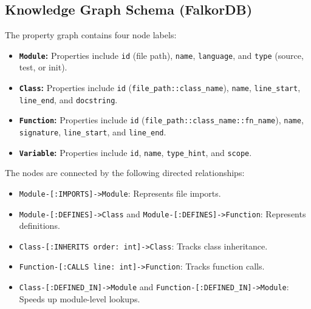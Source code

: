 \documentclass[12pt,a4paper,oneside]{report}
\begin{document}
\subsection{Knowledge Graph Schema (FalkorDB)}
The property graph contains four node labels:
\begin{itemize}
    \item \textbf{\texttt{Module}:} Properties include \texttt{id} (file path), \texttt{name}, \texttt{language}, and \texttt{type} (source, test, or init).
    \item \textbf{\texttt{Class}:} Properties include \texttt{id} (\texttt{file\_path::class\_name}), \texttt{name}, \texttt{line\_start}, \texttt{line\_end}, and \texttt{docstring}.
    \item \textbf{\texttt{Function}:} Properties include \texttt{id} (\texttt{file\_path::class\_name::fn\_name}), \texttt{name}, \texttt{signature}, \texttt{line\_start}, and \texttt{line\_end}.
    \item \textbf{\texttt{Variable}:} Properties include \texttt{id}, \texttt{name}, \texttt{type\_hint}, and \texttt{scope}.
\end{itemize}

The nodes are connected by the following directed relationships:
\begin{itemize}
    \item \texttt{Module-[:IMPORTS]->Module}: Represents file imports.
    \item \texttt{Module-[:DEFINES]->Class} and \texttt{Module-[:DEFINES]->Function}: Represents definitions.
    \item \texttt{Class-[:INHERITS {order: int}]->Class}: Tracks class inheritance.
    \item \texttt{Function-[:CALLS {line: int}]->Function}: Tracks function calls.
    \item \texttt{Class-[:DEFINED\_IN]->Module} and \texttt{Function-[:DEFINED\_IN]->Module}: Speeds up module-level lookups.
\end{itemize}
\end{document}
